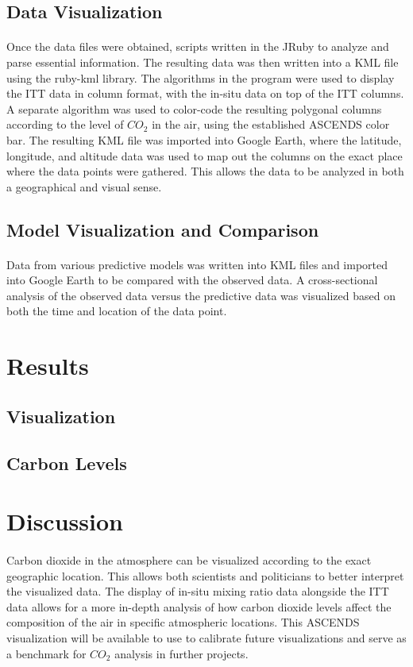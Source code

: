 \documentclass[12pt,letterpaper]{report}
\begin{document}
  \subsection*{Data Visualization}
   \paragraph{}
    Once the data files were obtained, scripts written in the JRuby to analyze and parse essential information. The resulting data was then written into a KML file using the ruby-kml library. The algorithms in the program were used to display the ITT data in column format, with the in-situ data on top of the ITT columns. A separate algorithm was used to color-code the resulting polygonal columns according to the level of $CO_2$ in the air, using the established ASCENDS color bar. The resulting KML file was imported into Google Earth, where the latitude, longitude, and altitude data was used to map out the columns on the exact place where the data points were gathered. This allows the data to be analyzed in both a geographical and visual sense.
  \subsection*{Model Visualization and Comparison}
   \paragraph{}
    Data from various predictive models was written into KML files and imported into Google Earth to be compared with the observed data. A cross-sectional analysis of the observed data versus the predictive data was visualized based on both the time and location of the data point.
 \section*{Results}
  \subsection*{Visualization}
  \subsection*{Carbon Levels}

 \section*{Discussion}
  \paragraph{}
   Carbon dioxide in the atmosphere can be visualized according to the exact geographic location. This allows both scientists and politicians to better interpret the visualized data. The display of in-situ mixing ratio data alongside the ITT data allows for a more in-depth analysis of how carbon dioxide levels affect the composition of the air in specific atmospheric locations. This ASCENDS visualization will be available to use to calibrate future visualizations and serve as a benchmark for $CO_2$ analysis in further projects.
\end{document}
